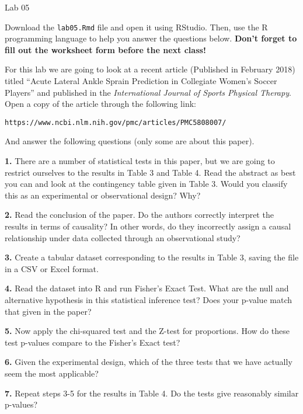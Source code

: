 \documentclass{tufte-handout}
\begin{document}
\justify

{\LARGE Lab 05}

\vspace*{18pt}

Download the \texttt{lab05.Rmd} file and open it using RStudio. Then, use the
R programming language to help you answer the questions below. \textbf{Don't
forget to fill out the worksheet form before the next class!}

For this lab we are going to look at a recent article (Published in
February 2018) titled ``Acute Lateral Ankle Sprain Prediction in Collegiate
Women's Soccer Players'' and published in the \textit{International Journal of
Sports Physical Therapy}. Open a copy of the article through the following
link:
\begin{center}
\texttt{https://www.ncbi.nlm.nih.gov/pmc/articles/PMC5808007/}
\end{center}
And answer the following questions (only some are about this paper).

\vspace*{12pt}

\textbf{1.} There are a number of statistical tests in this paper, but we are
going to restrict ourselves to the results in Table 3 and Table 4. Read the
abstract as best you can and look at the contingency table given in Table 3.
Would you classify this as an experimental or observational design? Why?

\textbf{2.} Read the conclusion of the paper. Do the authors correctly
interpret the results in terms of causality? In other words, do they
incorrectly assign a causal relationship under data collected through an
observational study?

\textbf{3.} Create a tabular dataset corresponding to the results in Table 3,
saving the file in a CSV or Excel format.

\textbf{4.} Read the dataset into R and run Fisher's Exact Test. What are the
null and alternative hypothesis in this statistical inference test? Does your
p-value match that given in the paper?

\textbf{5.} Now apply the chi-squared test and the Z-test for proportions.
How do these test p-values compare to the Fisher's Exact test?

\textbf{6.} Given the experimental design, which of the three tests that we
have actually seem the most applicable?

\textbf{7.} Repeat steps 3-5 for the results in Table 4. Do the tests give
reasonably similar p-values?


\end{document}
